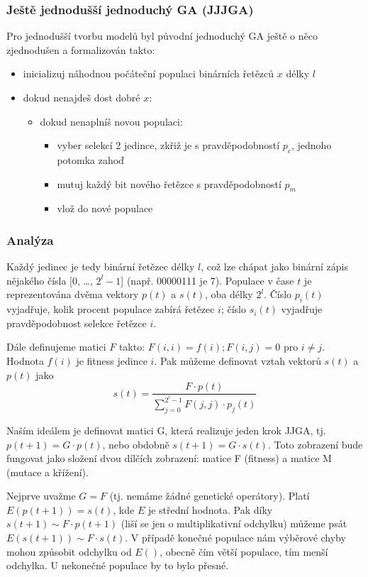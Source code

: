 \subsubsection{Ještě jednodušší jednoduchý GA (JJJGA)}
Pro jednodušší tvorbu modelů byl původní jednoduchý GA ještě o něco zjednodušen a formalizován takto:
\begin{itemize}
	\leftskip 20pt
	\setlength{\itemsep}{0pt}
	\item inicializuj náhodnou počáteční populaci binárních řetězců $x$ délky $l$
	\item dokud nenajdeš dost dobré $x$:
	\begin{itemize}
		\leftskip 40pt
		\setlength{\itemsep}{0pt}
		\item dokud nenaplníš novou populaci:
		\begin{itemize}
			\leftskip 40pt
			\setlength{\itemsep}{0pt}
			\item vyber selekcí 2 jedince, zkřiž je s pravděpodobností $p_c$, jednoho potomka zahoď
			\item mutuj každý bit nového řetězce s pravděpodobností $p_m$
			\item vlož do nové populace
		\end{itemize}
	\end{itemize}
\end{itemize}

\subsubsection{Analýza}
Každý jedinec je tedy binární řetězec délky $l$, což lze chápat jako binární zápis nějakého čísla [0, \dots, $2^l-1$] (např. 00000111 je 7). Populace v čase $t$ je reprezentována dvěma vektory $p(t)$ a $s(t)$, oba délky $2^l$. Číslo $p_i(t)$ vyjadřuje, kolik procent populace zabírá řetězec $i$; číslo $s_i(t)$ vyjadřuje pravděpodobnost selekce řetězce $i$.

Dále definujeme matici $F$ takto: $F(i,i) = f(i); F(i,j) = 0$ pro $i \neq j$. Hodnota $f(i)$ je fitness jedince $i$. Pak můžeme definovat vztah vektorů $s(t)$ a $p(t)$ jako
$$s(t) = \frac{F \cdot p(t)}{\sum\limits_{j=0}^{2^l-1} F(j,j) \cdot p_j(t)}$$

Naším ideálem je definovat matici G, která realizuje jeden krok JJGA, tj. $p(t+1) = G \cdot p(t)$, nebo obdobně $s(t+1) = G \cdot s(t)$. Toto zobrazení bude fungovat jako složení dvou dílčích zobrazení: matice F (fitness) a matice M (mutace a křížení). 

Nejprve uvažme $G=F$ (tj. nemáme žádné genetické operátory). Platí $E(p(t+1)) = s(t)$, kde $E$ je střední hodnota. Pak díky $s(t+1) \sim F \cdot p(t+1)$ (liší se jen o multiplikativní odchylku) můžeme psát $E(s(t+1)) \sim F \cdot s(t)$. V případě konečné populace nám výběrové chyby mohou způsobit odchylku od $E()$, obecně čím větší populace, tím menší odchylka. U nekonečné populace by to bylo přesné.

